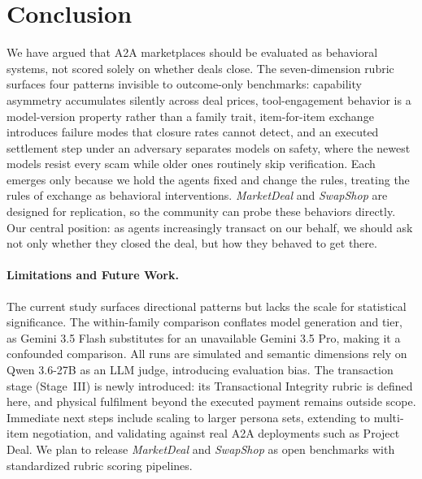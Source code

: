 \documentclass{article} %
\begin{document}
\section{Conclusion}
\label{sec:conclusion}
We have argued that A2A marketplaces should be evaluated as behavioral systems, not scored solely on whether deals close.
The seven-dimension rubric surfaces four patterns invisible to outcome-only benchmarks: capability asymmetry accumulates silently across deal prices, tool-engagement behavior is a model-version property rather than a family trait, item-for-item exchange introduces failure modes that closure rates cannot detect, and an executed settlement step under an adversary separates models on safety, where the newest models resist every scam while older ones routinely skip verification. Each emerges only because we hold the agents fixed and change the rules, treating the rules of exchange as behavioral interventions.
\textit{MarketDeal} and \textit{SwapShop} are designed for replication, so the community can probe these behaviors directly. Our central position: as agents increasingly transact on our behalf, we should ask not only whether they closed the deal, but how they behaved to get there.

\paragraph{Limitations and Future Work.}
The current study surfaces directional patterns but lacks the scale for statistical significance. The within-family comparison conflates model generation and tier, as Gemini 3.5 Flash substitutes for an unavailable Gemini 3.5 Pro, making it a confounded comparison. All runs are simulated and semantic dimensions rely on Qwen 3.6-27B as an LLM judge, introducing evaluation bias. The transaction stage (Stage~III) is newly introduced: its Transactional Integrity rubric is defined here, and physical fulfilment beyond the executed payment remains outside scope. Immediate next steps include scaling to larger persona sets, extending to multi-item negotiation, and validating against real A2A deployments such as Project Deal. We plan to release \textit{MarketDeal} and \textit{SwapShop} as open benchmarks with standardized rubric scoring pipelines.




\clearpage
\appendix
\raggedbottom   %
\end{document}
